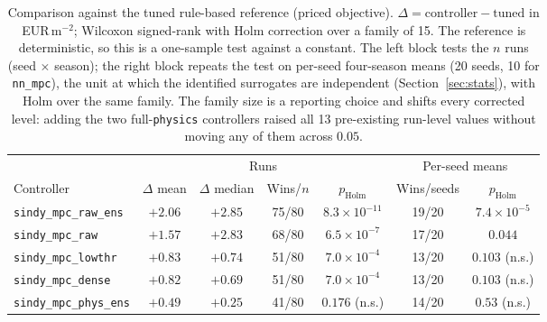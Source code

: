 \begin{table}[t]
\centering
\caption{Comparison against the tuned rule-based reference (priced objective).
$\Delta = \text{controller} - \text{tuned}$ in EUR\,m$^{-2}$; Wilcoxon signed-rank
\cite{wilcoxon1945} with Holm correction \cite{holm1979} over a family of 15. The
reference is deterministic, so this is a one-sample test against a constant. The left
block tests the $n$ runs (seed $\times$ season); the right block repeats the test on
per-seed four-season means (20 seeds, 10 for \texttt{nn\_mpc}), the unit at which the
identified surrogates are independent (Section~\ref{sec:stats}), with Holm over the same
family. The family size is a reporting choice and shifts every corrected level: adding the
two full-\texttt{physics} controllers raised all 13 pre-existing run-level values without
moving any of them across $0.05$.}
\label{tab:wilcoxon}
\small
\begin{tabular}{@{}lcccccc@{}}
\toprule
 & \multicolumn{4}{c}{Runs} & \multicolumn{2}{c}{Per-seed means} \\
\cmidrule(lr){2-5}\cmidrule(lr){6-7}
Controller & $\Delta$ mean & $\Delta$ median & Wins/$n$ & $p_{\text{Holm}}$ & Wins/seeds & $p_{\text{Holm}}$ \\
\midrule
\texttt{sindy\_mpc\_raw\_ens}     & $+2.06$ & $+2.85$ & 75/80 & $8.3\times10^{-11}$ & 19/20 & $7.4\times10^{-5}$ \\
\texttt{sindy\_mpc\_raw}          & $+1.57$ & $+2.83$ & 68/80 & $6.5\times10^{-7}$ & 17/20 & $0.044$ \\
\texttt{sindy\_mpc\_lowthr}       & $+0.83$ & $+0.74$ & 51/80 & $7.0\times10^{-4}$ & 13/20 & $0.103$ (n.s.) \\
\texttt{sindy\_mpc\_dense}        & $+0.82$ & $+0.69$ & 51/80 & $7.0\times10^{-4}$ & 13/20 & $0.103$ (n.s.) \\
\texttt{sindy\_mpc\_phys\_ens}    & $+0.49$ & $+0.25$ & 41/80 & $0.176$ (n.s.) & 14/20 & $0.53$ (n.s.) \\

\end{tabular}
\end{table}
